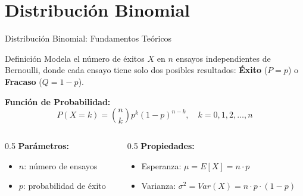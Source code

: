 \documentclass[aspectratio=169, 10pt]{beamer}
\begin{document}
\section{Distribución Binomial}

\begin{frame}{Distribución Binomial: Fundamentos Teóricos}
    \begin{block}{Definición}
        Modela el número de éxitos $X$ en $n$ ensayos independientes de Bernoulli, donde cada ensayo tiene solo dos posibles resultados: \textbf{Éxito} ($P = p$) o \textbf{Fracaso} ($Q = 1-p$).
    \end{block}
    
    \vspace{0.2cm}
    \textbf{Función  de Probabilidad:}
    $$P(X = k) = \binom{n}{k} p^k (1-p)^{n-k}, \quad k = 0, 1, 2, \dots, n$$

    \begin{columns}
        \begin{column}{0.5\textwidth}
            \textbf{Parámetros:}
            \begin{itemize}
                \item $n$: número de ensayos
                \item $p$: probabilidad de éxito
            \end{itemize}
        \end{column}
        \begin{column}{0.5\textwidth}
            \textbf{Propiedades:}
            \begin{itemize}
                \item Esperanza: $\mu = E[X] = n \cdot p$
                \item Varianza: $\sigma^2 = Var(X) = n \cdot p \cdot (1-p)$
            \end{itemize}
        \end{column}
    \end{columns}
\end{frame}
\end{document}
